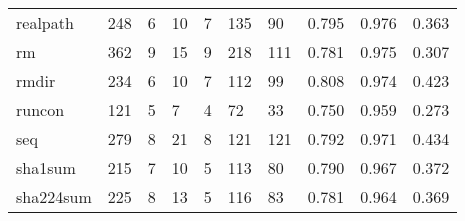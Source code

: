 \begin{longtable}{lp{2.0cm}p{2.0cm}p{2.0cm}p{2.0cm}p{2.0cm}p{2.0cm}p{2.0cm}p{2.0cm}p{2.0cm}}
realpath  &                    248 &                                  6 &                                10 &                                7 &                               135 &                              90 &                                   0.795 &                                  0.976 &                                0.363 \\
rm        &                    362 &                                  9 &                                15 &                                9 &                               218 &                             111 &                                   0.781 &                                  0.975 &                                0.307 \\
rmdir     &                    234 &                                  6 &                                10 &                                7 &                               112 &                              99 &                                   0.808 &                                  0.974 &                                0.423 \\
runcon    &                    121 &                                  5 &                                 7 &                                4 &                                72 &                              33 &                                   0.750 &                                  0.959 &                                0.273 \\
seq       &                    279 &                                  8 &                                21 &                                8 &                               121 &                             121 &                                   0.792 &                                  0.971 &                                0.434 \\
sha1sum   &                    215 &                                  7 &                                10 &                                5 &                               113 &                              80 &                                   0.790 &                                  0.967 &                                0.372 \\
sha224sum &                    225 &                                  8 &                                13 &                                5 &                               116 &                              83 &                                   0.781 &                                  0.964 &                                0.369 \\

\end{longtable}
